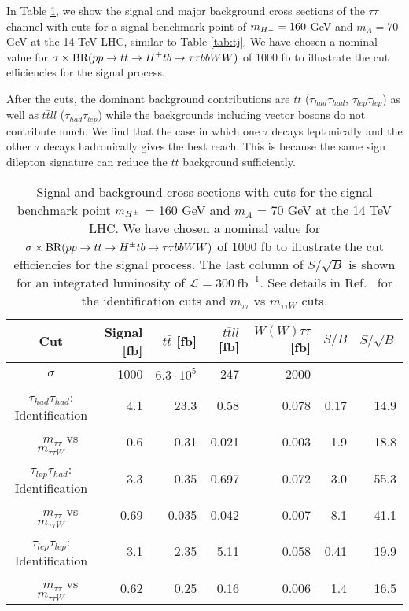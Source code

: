 In Table \ref{tab:tt}, we show the signal and  major  background cross sections of the $\tau\tau$ channel with cuts for a signal benchmark point of $m_{H^{\pm}} = 160$ GeV and $m_A =  70$ GeV at the 14 TeV LHC, similar to Table \ref{tab:tj}.   We have chosen a nominal value for $\sigma \times \text{BR}(pp \rightarrow tt \to H^{\pm} tb \rightarrow  \tau\tau bb WW)$ of 1000 fb to illustrate the cut efficiencies for the signal process. 

After the cuts,   the dominant background contributions are $t\bar{t}$ ($\tau_{had}\tau_{had}$,  $\tau_{lep}\tau_{lep}$) as well as  $t\bar{t}ll$ ($\tau_{had}\tau_{lep}$)    while the backgrounds including vector bosons do not contribute much. We find  that the case in which one $\tau$ decays leptonically and the other $\tau$ decays hadronically gives the best reach. This is because the same sign dilepton signature can reduce the $t\bar{t}$ background sufficiently.    

 
\begin{table}[h]
\centering
\resizebox{14cm}{!} {
\begin{tabular}{ |c | r |r r r |r r|}  \hline
Cut 		 								&Signal [fb] 	&$t\bar{t}$ [fb] 		&$t\bar{t}ll$ [fb]	&$W(W)\tau\tau$ [fb]	&$S/B$	&$S/\sqrt{B}$	\\
\hline
$\sigma$    								&1000 		&$6.3 \cdot 10^5$	&  247   		   	& 2000    		 &		 	 &		 \\
\hline
$\tau_{had}\tau_{had}$: Identification  		 			&4.1	 		&           23.3 		&    0.58			 			& 0.078     		& 0.17	&	14.9		\\
\ \  \ $m_{\tau\tau}$ vs $m_{\tau\tau W}$  			&0.6   		&           0.31 		&    0.021 			 			& 0.003     		& 1.9  	&	18.8		\\
\hline
 $\tau_{lep}\tau_{had}$: Identification 	 				&3.3 			&           0.35 		&    0.697 			 			& 0.072     		& 3.0		&	55.3		\\
 \ \ \  $m_{\tau\tau}$ vs $m_{\tau\tau W}$ 			&0.69 		&           0.035 		&    0.042 			 			& 0.007   		& 8.1		&	41.1		\\
\hline
 $\tau_{lep}\tau_{lep}$: Identification  	 				&3.1			&           2.35 		&    5.11 			 				& 0.058     		& 0.41	&	19.9		\\
 \ \  \ $m_{\tau\tau}$ vs $m_{\tau\tau W}$ 			&0.62 		&           0.25 		&    0.16 			 				& 0.006         	& 1.4		&	16.5		\\
 \hline
\end{tabular}
}
\caption{Signal and background cross sections with cuts for the signal benchmark point $m_{H^{\pm}}$ = 160 GeV   and $m_A$ = 70 GeV at the 14 TeV LHC.  We have chosen a nominal value for $\sigma \times \text{BR}(pp \rightarrow tt \to H^{\pm} tb \rightarrow   \tau\tau bb WW)$ of 1000 fb to illustrate the cut efficiencies for the signal process.  The last column of $S/\sqrt{B}$ is shown for an integrated luminosity of $\mathcal{L}=300\  \text{fb}^{-1}$.   See details in Ref.~\cite{Coleppa:2014cca} for the identification cuts and  $m_{\tau\tau}$ vs $m_{\tau\tau W}$ cuts.        }
\label{tab:tt}
\end{table}

